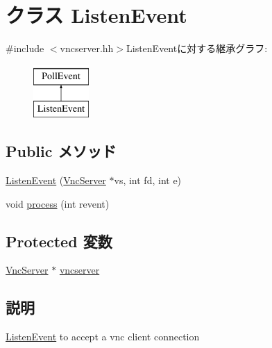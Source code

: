 \hypertarget{classVncServer_1_1ListenEvent}{
\section{クラス ListenEvent}
\label{classVncServer_1_1ListenEvent}
}


{\ttfamily \#include $<$vncserver.hh$>$}ListenEventに対する継承グラフ:\begin{figure}[H]
\begin{center}
\leavevmode
\includegraphics[height=2cm]{classVncServer_1_1ListenEvent}
\end{center}
\end{figure}
\subsection*{Public メソッド}
\begin{DoxyCompactItemize}
\item 
\hyperlink{classVncServer_1_1ListenEvent_a58e725539783734ac669d71572f522aa}{ListenEvent} (\hyperlink{classVncServer}{VncServer} $\ast$vs, int fd, int e)
\item 
void \hyperlink{classVncServer_1_1ListenEvent_aedacbaeee0c89ceca526874c34f6b20b}{process} (int revent)
\end{DoxyCompactItemize}
\subsection*{Protected 変数}
\begin{DoxyCompactItemize}
\item 
\hyperlink{classVncServer}{VncServer} $\ast$ \hyperlink{classVncServer_1_1ListenEvent_ac122859a241350f501e4f77da81b669f}{vncserver}
\end{DoxyCompactItemize}


\subsection{説明}
\hyperlink{classVncServer_1_1ListenEvent}{ListenEvent} to accept a vnc client connection 

